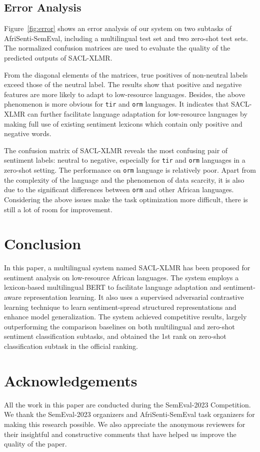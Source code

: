 \documentclass[11pt]{article}
\begin{document}
\subsection{Error Analysis}

Figure~\ref{fig:error} shows an error analysis of our system on two subtasks of AfriSenti-SemEval, including a multilingual test set and two zero-shot test sets. The normalized confusion matrices are used to evaluate the quality of the predicted outputs of SACL-XLMR.

From the diagonal elements of the matrices, 
true positives of non-neutral labels exceed those of the neutral label.
The results show that positive and negative features are more likely to adapt to low-resource languages. 
Besides, the above phenomenon is more obvious for \texttt{tir} and \texttt{orm} languages.
It indicates that SACL-XLMR can further facilitate language adaptation for low-resource languages by making full use of existing sentiment lexicons which contain only positive and negative words.

The confusion matrix of SACL-XLMR reveals the most confusing pair of sentiment labels: neutral to negative, especially for \texttt{tir} and \texttt{orm} languages in a zero-shot setting. 
The performance on \texttt{orm} language is relatively poor. Apart from the complexity of the language and the phenomenon of data scarcity, it is also due to the significant differences between \texttt{orm} and other African languages.
Considering the above issues make the task optimization more difficult, there is still a lot of room for improvement.


\section{Conclusion}
In this paper, a multilingual system named SACL-XLMR has been proposed for sentiment analysis on low-resource African languages. The system employs a lexicon-based multilingual BERT to facilitate language adaptation and sentiment-aware representation learning. It also uses a supervised adversarial contrastive learning technique to learn sentiment-spread structured representations and enhance model generalization. The system achieved competitive results, largely outperforming the comparison baselines on both multilingual and zero-shot sentiment classification subtasks, and obtained the 1st rank on zero-shot classification subtask in the official ranking.

\section*{Acknowledgements}
All the work in this paper are conducted during the SemEval-2023 Competition.
We thank the SemEval-2023 organizers and AfriSenti-SemEval task organizers for making this research possible.
We also appreciate the anonymous reviewers for their insightful and constructive comments that have helped us improve the quality of the paper.



\end{document}
